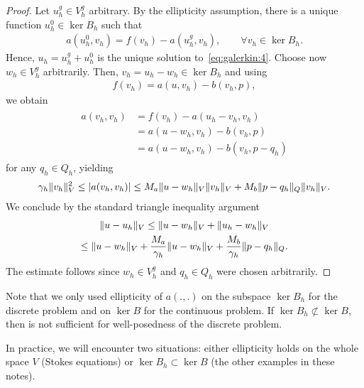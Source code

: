 \begin{proof}
  Let $u_h^g \in V_h^g$ arbitrary. By the ellipticity assumption,
  there is a unique function $u_h^0\in \ker{B_h}$ such that
  \begin{gather}
    a(u_h^0,v_h) = f(v_h) - a(u_h^g,v_h),
    \qquad\forall v_h\in \ker{B_h}.
  \end{gather}
  Hence, $u_h = u_h^g + u_h^0$ is the unique solution
  to~\eqref{eq:galerkin:4}. Choose now $w_h\in V_h^g$
  arbitrarily. Then, $v_h = u_h-w_h\in \ker{B_h}$ and using
  \begin{gather}
    f(v_h) = a(u, v_h) - b(v_h, p),
  \end{gather}
  we obtain
  \begin{gather}
    \begin{split}
      \label{eq:galerkin:9}
      a(v_h, v_h)
      &= f(v_h) - a(u_h-v_h, v_h) \\
      &= a(u-w_h, v_h) - b(v_h, p) \\
      &= a(u-w_h, v_h) - b(v_h, p-q_h)
    \end{split}
  \end{gather}
  for any $q_h\in Q_h$, yielding
  \begin{gather}
    \gamma_h\lVert v_h\rVert^2_V
    \le \lvert a(v_h, v_h)\rvert
    \le M_a \lVert u-w_h\rVert_V \lVert v_h\rVert_V
      + M_b \lVert p-q_h\rVert_Q \lVert v_h\rVert_V.
  \end{gather}
  We conclude by the standard triangle inequality argument
  \begin{multline}
    \lVert u-u_h\rVert_V \le \lVert u-w_h\rVert_V + \lVert u_h-w_h\rVert_V
    \\
    \le \lVert u-w_h\rVert_V + \frac{M_a}{\gamma_h} \lVert u-w_h\rVert_V
    + \frac{M_b}{\gamma_h} \lVert p-q_h\rVert_Q.
  \end{multline}
  The estimate follows since $w_h\in V_h^g$ and $q_h\in Q_h$ were
  chosen arbitrarily.
\end{proof}

\begin{remark}
  Note that we only used ellipticity of $a(.,.)$ on the subspace
  $\ker{B_h}$ for the discrete problem and on $\ker B$ for the
  continuous problem. If $\ker{B_h}\not\subset\ker{B}$, then
   is not sufficient for
  well-posedness of the discrete problem.
  
  In practice, we will encounter two situations: either ellipticity
  holds on the whole space $V$ (Stokes equations) or
  $\ker{B_h}\subset\ker{B}$ (the other examples in these notes).
\end{remark}

